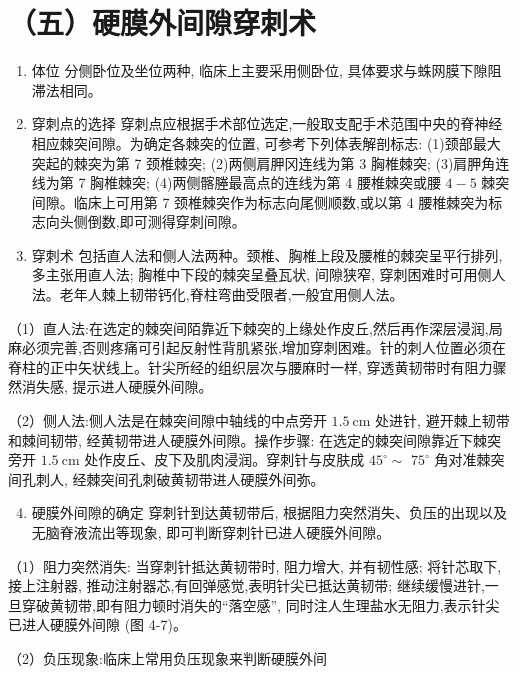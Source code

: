 \documentclass[10pt]{article}
\begin{document}
\section*{（五）硬膜外间隙穿刺术}
\begin{enumerate}
  \item 体位 分侧卧位及坐位两种, 临床上主要采用侧卧位, 具体要求与蛛网膜下隙阻滞法相同。

  \item 穿刺点的选择 穿刺点应根据手术部位选定,一般取支配手术范围中央的脊神经相应棘突间隙。为确定各棘突的位置, 可参考下列体表解剖标志: (1)颈部最大突起的棘突为第 7 颈椎棘突; (2)两侧肩胛冈连线为第 3 胸椎棘突; (3)肩胛角连线为第 7 胸椎棘突; (4)两侧髂塍最高点的连线为第 4 腰椎棘突或腰 $4-5$ 棘突间隙。临床上可用第 7 颈椎棘突作为标志向尾侧顺数,或以第 4 腰椎棘突为标志向头侧倒数,即可测得穿刺间隙。

  \item 穿刺术 包括直人法和侧人法两种。颈椎、胸椎上段及腰椎的棘突呈平行排列, 多主张用直人法; 胸椎中下段的棘突呈叠瓦状, 间隙狭窄, 穿刺困难时可用侧人法。老年人棘上韧带钙化,脊柱弯曲受限者,一般宜用侧人法。

\end{enumerate}

（1）直人法:在选定的棘突间陌靠近下棘突的上缘处作皮丘,然后再作深层浸润,局麻必须完善,否则疼痛可引起反射性背肌紧张,增加穿刺困难。针的刺人位置必须在脊柱的正中矢状线上。针尖所经的组织层次与腰麻时一样, 穿透黄韧带时有阻力骤然消失感, 提示进人硬膜外间隙。

（2）侧人法:侧人法是在棘突间隙中轴线的中点旁开 $1.5 \mathrm{~cm}$ 处进针, 避开棘上韧带和棘间韧带, 经黄韧带进人硬膜外间隙。操作步骤: 在选定的棘突间隙靠近下棘突旁开 $1.5 \mathrm{~cm}$ 处作皮丘、皮下及肌肉浸润。穿刺针与皮肤成 $45^{\circ} \sim$ $75^{\circ}$ 角对准棘突间孔刺人, 经棘突间孔刺破黄韧带进人硬膜外间弥。

\begin{enumerate}
  \setcounter{enumi}{3}
  \item 硬膜外间隙的确定 穿刺针到达黄韧带后, 根据阻力突然消失、负压的出现以及无脑脊液流出等现象, 即可判断穿刺针已进人硬膜外间隙。
\end{enumerate}

（1）阻力突然消失: 当穿刺针抵达黄韧带时, 阻力增大, 并有韧性感; 将针芯取下, 接上注射器, 推动注射器芯,有回弹感觉,表明针尖已抵达黄韧带; 继续缓慢进针,一旦穿破黄韧带,即有阻力顿时消失的“落空感”, 同时注人生理盐水无阻力,表示针尖已进人硬膜外间隙 (图 4-7)。

（2）负压现象:临床上常用负压现象来判断硬膜外间
\end{document}
